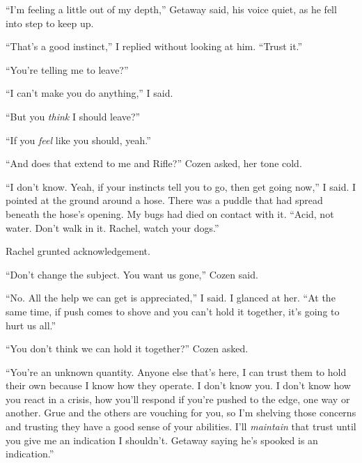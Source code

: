 ``I'm feeling a little out of my depth,'' Getaway said, his voice quiet, as he fell into step to keep up.



``That's a good instinct,'' I replied without looking at him.  ``Trust it.''



``You're telling me to leave?''



``I can't make you do anything,'' I said.



``But you \emph{think} I should leave?''



``If you \emph{feel} like you should, yeah.''



``And does that extend to me and Rifle?'' Cozen asked, her tone cold.



``I don't know.  Yeah, if your instincts tell you to go, then get going now,'' I said.  I pointed at the ground around a hose.  There was a puddle that had spread beneath the hose's opening.  My bugs had died on contact with it.  ``Acid, not water.  Don't walk in it.  Rachel, watch your dogs.''



Rachel grunted acknowledgement.



``Don't change the subject.  You want us gone,'' Cozen said.



``No.  All the help we can get is appreciated,'' I said.  I glanced at her.  ``At the same time, if push comes to shove and you can't hold it together, it's going to hurt us all.''



``You don't think we can hold it together?'' Cozen asked.



``You're an unknown quantity.  Anyone else that's here, I can trust them to hold their own because I know how they operate.  I don't know you.  I don't know how you react in a crisis, how you'll respond if you're pushed to the edge, one way or another.  Grue and the others are vouching for you, so I'm shelving those concerns and trusting they have a good sense of your abilities.  I'll \emph{maintain }that trust until you give me an indication I shouldn't.  Getaway saying he's spooked is an indication.''



